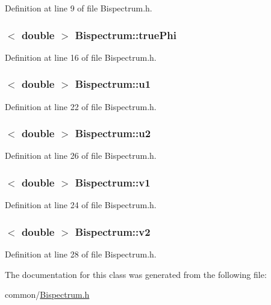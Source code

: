 Definition at line 9 of file Bispectrum.h.

\hypertarget{classBispectrum_ac6576cd26a230281ed9471dc18f6c128}{
\subsubsection[{truePhi}]{$<$ double $>$ {\bf Bispectrum::truePhi}}}
\label{classBispectrum_ac6576cd26a230281ed9471dc18f6c128}


Definition at line 16 of file Bispectrum.h.

\hypertarget{classBispectrum_a4aa12f9f42ec6a9a622eae258886a70a}{
\subsubsection[{u1}]{$<$ double $>$ {\bf Bispectrum::u1}}}
\label{classBispectrum_a4aa12f9f42ec6a9a622eae258886a70a}


Definition at line 22 of file Bispectrum.h.

\hypertarget{classBispectrum_a1273b649ed0b0395095e46553abd4590}{
\subsubsection[{u2}]{$<$ double $>$ {\bf Bispectrum::u2}}}
\label{classBispectrum_a1273b649ed0b0395095e46553abd4590}


Definition at line 26 of file Bispectrum.h.

\hypertarget{classBispectrum_aaaba6a43c24620293150b6c8b1e7e3cc}{
\subsubsection[{v1}]{$<$ double $>$ {\bf Bispectrum::v1}}}
\label{classBispectrum_aaaba6a43c24620293150b6c8b1e7e3cc}


Definition at line 24 of file Bispectrum.h.

\hypertarget{classBispectrum_a3f96bf8f14f36a1b554f094e74eea14e}{
\subsubsection[{v2}]{$<$ double $>$ {\bf Bispectrum::v2}}}
\label{classBispectrum_a3f96bf8f14f36a1b554f094e74eea14e}


Definition at line 28 of file Bispectrum.h.



The documentation for this class was generated from the following file:\begin{DoxyCompactItemize}
\item 
common/\hyperlink{Bispectrum_8h}{Bispectrum.h}\end{DoxyCompactItemize}
